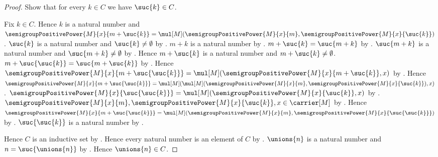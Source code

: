 \begin{proof}
    Show that for every $k\in C$ we have $\suc{k}\in C$.
    \begin{subproof}
        Fix $k\in C$.
        Hence $k$ is a natural number and
            $\semigroupPositivePower{M}{x}{m+\suc{k}}
                =\mul[M](\semigroupPositivePower{M}{x}{m},
                    \semigroupPositivePower{M}{x}{\suc{k}})$.
        $\suc{k}$ is a natural number and $\suc{k}\neq\emptyset$ by
            .
        $m+k$ is a natural number by
            .
        $m+\suc{k}=\suc{m+k}$ by
            .
        $\suc{m+k}$ is a natural number and
            $\suc{m+k}\neq\emptyset$ by
            .
        Hence $m+\suc{k}$ is a natural number and
            $m+\suc{k}\neq\emptyset$.
        $m+\suc{\suc{k}}=\suc{m+\suc{k}}$ by
            .
        Hence $\semigroupPositivePower{M}{x}{m+\suc{\suc{k}}}
            =\mul[M](\semigroupPositivePower{M}{x}{m+\suc{k}},x)$ by
            .
        Hence $\semigroupPositivePower{M}{x}{m+\suc{\suc{k}}}
            =\mul[M](
                \mul[M](\semigroupPositivePower{M}{x}{m},
                    \semigroupPositivePower{M}{x}{\suc{k}}),x)$.
        $\semigroupPositivePower{M}{x}{\suc{\suc{k}}}
            =\mul[M](\semigroupPositivePower{M}{x}{\suc{k}},x)$ by
            .
        $\semigroupPositivePower{M}{x}{m},
            \semigroupPositivePower{M}{x}{\suc{k}},x\in\carrier[M]$ by
            .
        Hence $\semigroupPositivePower{M}{x}{m+\suc{\suc{k}}}
            =\mul[M](\semigroupPositivePower{M}{x}{m},
                \semigroupPositivePower{M}{x}{\suc{\suc{k}}})$ by
            .
        $\suc{\suc{k}}$ is a natural number by .
    \end{subproof}
    Hence $C$ is an inductive set by .
    Hence every natural number is an element of $C$ by
        .
    $\unions{n}$ is a natural number and
        $n=\suc{\unions{n}}$ by
        .
    Hence $\unions{n}\in C$.
\end{proof}

